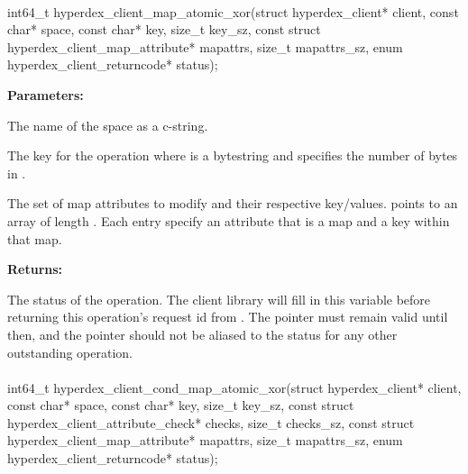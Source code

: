 \paragraph{}
\begin{ccode}
int64_t hyperdex_client_map_atomic_xor(struct hyperdex_client* client,
                const char* space,
                const char* key, size_t key_sz,
                const struct hyperdex_client_map_attribute* mapattrs, size_t mapattrs_sz,
                enum hyperdex_client_returncode* status);
\end{ccode}
\funcdesc 

\noindent\textbf{Parameters:}
\begin{description}[labelindent=\widthof{{\code{mapattrs}, \code{mapattrs\_sz}}},leftmargin=*,noitemsep,nolistsep,align=right]
\item[\code{space}] The name of the space as a c-string.
\item[\code{key}, \code{key\_sz}] The key for the operation where  is a bytestring and  specifies the number of bytes in .
\item[\code{mapattrs}, \code{mapattrs\_sz}] The set of map attributes to modify and their respective key/values.   points to an array of length .  Each entry specify an attribute that is a map and a key within that map.
\end{description}

\noindent\textbf{Returns:}
\begin{description}[labelindent=\widthof{{\code{status}}},leftmargin=*,noitemsep,nolistsep,align=right]
\item[\code{status}] The status of the operation.  The client library will fill in this variable before returning this operation's request id from .  The pointer must remain valid until then, and the pointer should not be aliased to the status for any other outstanding operation.
\end{description}

\paragraph{}
\begin{ccode}
int64_t hyperdex_client_cond_map_atomic_xor(struct hyperdex_client* client,
                const char* space,
                const char* key, size_t key_sz,
                const struct hyperdex_client_attribute_check* checks, size_t checks_sz,
                const struct hyperdex_client_map_attribute* mapattrs, size_t mapattrs_sz,
                enum hyperdex_client_returncode* status);
\end{ccode}
\funcdesc 

